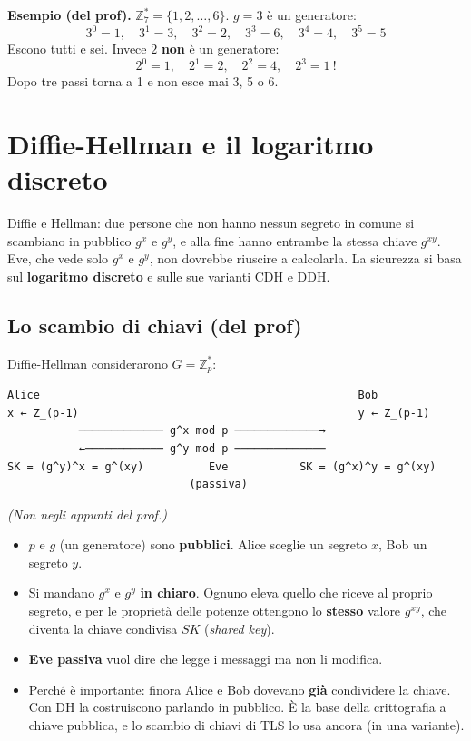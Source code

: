 \begin{esempio}
\textbf{Esempio (del prof).} \(\mathbb{Z}_7^* = \{1, 2, \dots, 6\}\). \(g = 3\) è un generatore:
\[
3^0 = 1, \quad 3^1 = 3, \quad 3^2 = 2, \quad 3^3 = 6, \quad 3^4 = 4, \quad 3^5 = 5
\]
Escono tutti e sei. Invece \(2\) \textbf{non} è un generatore:
\[
2^0 = 1, \quad 2^1 = 2, \quad 2^2 = 4, \quad 2^3 = 1 \ !
\]
Dopo tre passi torna a 1 e non esce mai 3, 5 o 6.
\end{esempio}

\section{Diffie-Hellman e il logaritmo discreto}

\begin{inbreve}
Diffie e Hellman: due persone che non hanno nessun segreto in comune si scambiano in pubblico \(g^x\) e \(g^y\), e alla fine hanno entrambe la stessa chiave \(g^{xy}\). Eve, che vede solo \(g^x\) e \(g^y\), non dovrebbe riuscire a calcolarla. La sicurezza si basa sul \textbf{logaritmo discreto} e sulle sue varianti CDH e DDH.
\end{inbreve}

\subsection{Lo scambio di chiavi (del prof)}

Diffie-Hellman considerarono \(G = \mathbb{Z}_p^*\):

\begin{verbatim}
Alice                                                 Bob
x ← Z_(p-1)                                           y ← Z_(p-1)
           ───────────── g^x mod p ─────────────→
           ←──────────── g^y mod p ──────────────
SK = (g^y)^x = g^(xy)          Eve           SK = (g^x)^y = g^(xy)
                            (passiva)
\end{verbatim}

\begin{nota}
\emph{(Non negli appunti del prof.)}
\begin{itemize}
  \item \(p\) e \(g\) (un generatore) sono \textbf{pubblici}. Alice sceglie un segreto \(x\), Bob un segreto \(y\).
  \item Si mandano \(g^x\) e \(g^y\) \textbf{in chiaro}. Ognuno eleva quello che riceve al proprio segreto, e per le proprietà delle potenze ottengono lo \textbf{stesso} valore \(g^{xy}\), che diventa la chiave condivisa \(SK\) (\emph{shared key}).
  \item \textbf{Eve passiva} vuol dire che legge i messaggi ma non li modifica.
  \item Perché è importante: finora Alice e Bob dovevano \textbf{già} condividere la chiave. Con DH la costruiscono parlando in pubblico. È la base della crittografia a chiave pubblica, e lo scambio di chiavi di TLS lo usa ancora (in una variante).
\end{itemize}
\end{nota}

